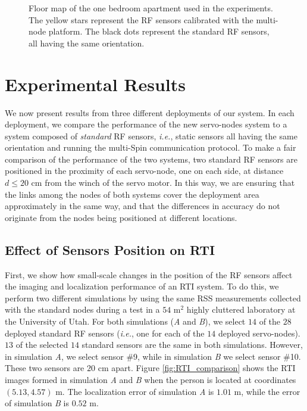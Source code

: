 \documentclass[conference]{IEEEtran}
\begin{document}
\begin{figure}[t]
    \begin{center}
        \caption{Floor map of the one bedroom apartment used in the experiments. The yellow stars represent the RF sensors calibrated with the multi-node platform. The black dots represent the standard RF sensors, all having the same orientation.}
        \label{fig:apartment_nodes}
    \end{center}
\end{figure}






\section{Experimental Results}
\label{sec:experimental_results}

We now present results from three different deployments of our system. In each deployment, we compare the performance of the new servo-nodes system to a system composed of \emph{standard} RF sensors, \emph{i.e.}, static sensors all having the same orientation and running the multi-Spin communication protocol. To make a fair comparison of the performance of the two systems, two standard RF sensors are positioned in the proximity of each servo-node, one on each side, at distance $d \le 20$ cm from the winch of the servo motor. In this way, we are ensuring that the links among the nodes of both systems cover the deployment area approximately in the same way, and that the differences in accuracy do not originate from the nodes being positioned at different locations.

\subsection{Effect of Sensors Position on RTI}
\label{sec:fade_level_effect}

First, we show how small-scale changes in the position of the RF sensors affect the imaging and localization performance of an RTI system. To do this, we perform two different simulations by using the same RSS measurements collected with the standard nodes during a test in a $54$ m$^2$ highly cluttered laboratory at the University of Utah. For both simulations (\emph{A} and \emph{B}), we select $14$ of the $28$ deployed standard RF sensors (\emph{i.e.}, one for each of the $14$ deployed servo-nodes). $13$ of the selected $14$ standard sensors are the same in both simulations. However, in simulation \emph{A}, we select sensor \#9, while in simulation \emph{B} we select sensor \#10. These two sensors are $20$ cm apart. Figure \ref{fig:RTI_comparison} shows the RTI images formed in simulation \emph{A} and \emph{B} when the person is located at coordinates $(5.13,4.57)$ m. The localization error of simulation \emph{A} is $1.01$ m, while the error of simulation \emph{B} is $0.52$ m.
\end{document}
